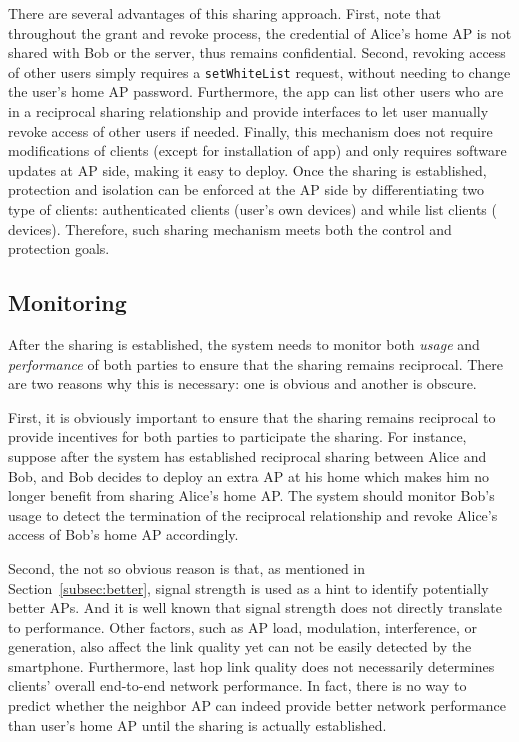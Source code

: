 There are several advantages of this sharing approach. First, note that
throughout the grant and revoke process, the \wifi{} credential of Alice's home
AP is not shared with Bob or the \wisefi{} server, thus remains confidential.
Second, revoking access of other \wisefi{} users simply requires a
\texttt{setWhiteList} request, without needing to change the user's home AP
password. Furthermore, the \wisefi{} app can list other \wisefi{}
users who are in a reciprocal sharing relationship and provide interfaces to let
user manually revoke access of other users if needed. Finally, this mechanism
does not require modifications of \wifi{} clients (except for installation of
\wisefi{} app) and only requires software updates at AP side, making it easy to
deploy.  Once the sharing is established, protection and isolation can be
enforced at the AP side by differentiating two type of clients: authenticated
clients (user's own devices) and while list clients (\wisefi{} devices).
Therefore, such sharing mechanism meets both the control and protection goals.


\subsection{Monitoring}
\label{subsec:monitoring}

After the sharing is established, the system needs to monitor both \wifi{}
\textit{usage} and \textit{performance} of both parties to ensure that the
sharing remains reciprocal.  There are two reasons why this is necessary: one is
obvious and another is obscure.

First, it is obviously important to ensure that the sharing remains reciprocal
to provide incentives for both parties to participate the sharing.
For instance, suppose after the system has established reciprocal \wifi{} sharing
between Alice and Bob, and Bob decides to deploy an extra AP at his home which
makes him no longer benefit from sharing Alice's home AP. The system should
monitor Bob's \wifi{} usage to detect the termination of the reciprocal
relationship and revoke Alice's access of Bob's home AP accordingly.

Second, the not so obvious reason is that, as mentioned in
Section~\ref{subsec:better}, \wifi{} signal strength is used as a hint to
identify potentially better APs. And it is well known that signal strength does
not directly translate to \wifi{} performance. Other factors, such as AP load,
modulation, interference, or \wifi{} generation, also affect the link quality
yet can not be easily detected by the smartphone. Furthermore, last hop \wifi{}
link quality does not necessarily determines clients' overall end-to-end network
performance. In fact, there is no way to predict whether the neighbor AP can
indeed provide better network performance than user's home AP until the sharing is
actually established.


